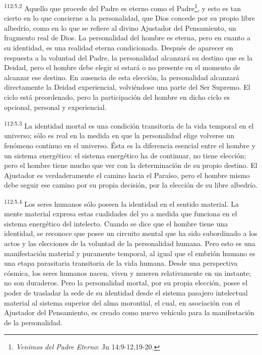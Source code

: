 \documentclass[twoside, 11pt]{book}
\begin{document}
\par
\textsuperscript{112:5.2} Aquello que procede del Padre es eterno como el Padre\footnote{\textit{Venimos del Padre Eterno}: Jn 14:9-12,19-20.}, y esto es tan cierto en lo que concierne a la personalidad, que Dios concede por su propio libre albedrío, como en lo que se refiere al divino Ajustador del Pensamiento, un fragmento real de Dios. La personalidad del hombre es eterna, pero en cuanto a su identidad, es una realidad eterna condicionada. Después de aparecer en respuesta a la voluntad del Padre, la personalidad alcanzará su destino que es la Deidad, pero el hombre debe elegir si estará o no presente en el momento de alcanzar ese destino. En ausencia de esta elección, la personalidad alcanzará directamente la Deidad experiencial, volviéndose una parte del Ser Supremo. El ciclo está preordenado, pero la participación del hombre en dicho ciclo es opcional, personal y experiencial.

\par
\textsuperscript{112:5.3} La identidad mortal es una condición transitoria de la vida temporal en el universo; sólo es real en la medida en que la personalidad elige volverse un fenómeno continuo en el universo. Ésta es la diferencia esencial entre el hombre y un sistema energético: el sistema energético ha de continuar, no tiene elección; pero el hombre tiene mucho que ver con la determinación de su propio destino. El Ajustador es verdaderamente el camino hacia el Paraíso, pero el hombre mismo debe seguir ese camino por su propia decisión, por la elección de su libre albedrío.

\par
\textsuperscript{112:5.4} Los seres humanos sólo poseen la identidad en el sentido material. La mente material expresa estas cualidades del yo a medida que funciona en el sistema energético del intelecto. Cuando se dice que el hombre tiene una identidad, se reconoce que posee un circuito mental que ha sido subordinado a los actos y las elecciones de la voluntad de la personalidad humana. Pero esto es una manifestación material y puramente temporal, al igual que el embrión humano es una etapa parasitaria transitoria de la vida humana. Desde una perspectiva cósmica, los seres humanos nacen, viven y mueren relativamente en un instante; no son duraderos. Pero la personalidad mortal, por su propia elección, posee el poder de trasladar la sede de su identidad desde el sistema pasajero intelectual material al sistema superior del alma morontial, el cual, en asociación con el Ajustador del Pensamiento, es creado como nuevo vehículo para la manifestación de la personalidad.
\end{document}
